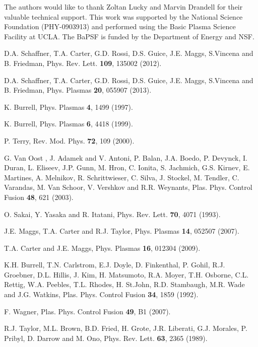 \documentclass[aip,pop,amsmath,amssymb,reprint,superscriptaddress]{revtex4-1} %
\begin{document}
The authors would like to thank Zoltan Lucky and Marvin Drandell for their valuable technical support.  This work
was supported by the National Science Foundation (PHY-0903913) and performed using the Basic Plasma Science Facility at UCLA. The BaPSF is funded by the
Department of Energy and NSF.

\providecommand{\noopsort}[1]{}\providecommand{\singleletter}[1]{#1}%
\begin{thebibliography}{10}

D.A. Schaffner, T.A. Carter, G.D. Rossi, D.S. Guice, J.E. Maggs, S.Vincena and B. Friedman, Phys. Rev. Lett. {\bf 109}, 135002 (2012).

D.A. Schaffner, T.A. Carter, G.D. Rossi, D.S. Guice, J.E. Maggs, S.Vincena and B. Friedman, Phys. Plasmas {\bf 20}, 055907 (2013).

K. Burrell, Phys. Plasmas {\bf 4},  1499  (1997).

K. Burrell, Phys. Plasmas {\bf 6},  4418  (1999).

P. Terry, Rev. Mod. Phys. {\bf 72},  109  (2000).

G. Van Oost , J. Adamek and V. Antoni, P. Balan, J.A. Boedo, P. Devynck, I. Duran, L. Eliseev, J.P. Gunn, M. Hron, C. Ionita, S. Jachmich, G.S. Kirnev, E. Martines, A. Melnikov, R. Schrittwieser, C. Silva, J. Stockel, M. Tendler, C. Varandas, M. Van Schoor, V. Vershkov and R.R. Weynants, Plas. Phys. Control Fusion {\bf 48}, 621 (2003).

O. Sakai, Y. Yasaka and R. Itatani, Phys. Rev. Lett. {\bf 70},  4071 (1993).

J.E. Maggs, T.A. Carter and R.J. Taylor, Phys. Plasmas {\bf 14},  052507  (2007).

T.A. Carter and J.E. Maggs, Phys. Plasmas {\bf 16},  012304  (2009).

K.H. Burrell, T.N. Carlstrom, E.J. Doyle, D. Finkenthal, P. Gohil, R.J. Groebner, D.L. Hillis, J. Kim, H. Matsumoto, R.A. Moyer, T.H. Osborne, C.L. Rettig, W.A. Peebles, T.L. Rhodes, H. St.John, R.D. Stambaugh, M.R. Wade and J.G. Watkins, Plas. Phys. Control Fusion {\bf 34}, 1859 (1992). 

F. Wagner, Plas. Phys. Control Fusion {\bf 49}, B1 (2007).

R.J. Taylor, M.L. Brown, B.D. Fried, H. Grote, J.R. Liberati, G.J. Morales, P. Pribyl, D. Darrow and M. Ono, Phys. Rev. Lett. {\bf 63},  2365  (1989).


\end{thebibliography}
\end{document}
